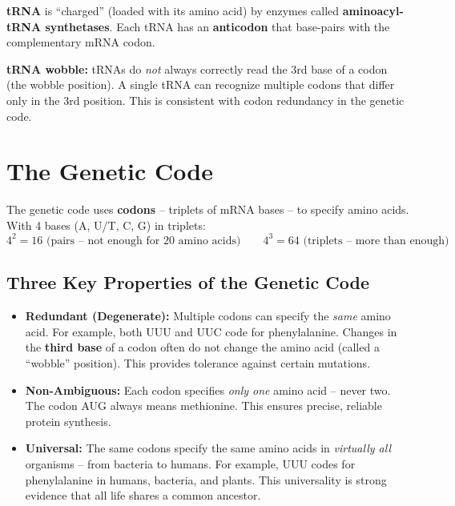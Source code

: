 \documentclass[11pt, letterpaper]{article}
\begin{document}
\textbf{tRNA} is ``charged'' (loaded with its amino acid) by enzymes called \textbf{aminoacyl-tRNA synthetases}. Each tRNA has an \textbf{anticodon} that base-pairs with the complementary mRNA codon.

\begin{tcolorbox}[colback=part4bg, colframe=sectionorange, arc=3pt, boxrule=1pt]
\textbf{tRNA wobble:} tRNAs do \emph{not} always correctly read the 3rd base of a codon (the wobble position). A single tRNA can recognize multiple codons that differ only in the 3rd position. This is consistent with codon redundancy in the genetic code.
\end{tcolorbox}

\section*{The Genetic Code}

The genetic code uses \textbf{codons} -- triplets of mRNA bases -- to specify amino acids. With 4 bases (A, U/T, C, G) in triplets:
\[
  4^2 = 16 \text{ (pairs -- not enough for 20 amino acids)} \qquad 4^3 = 64 \text{ (triplets -- more than enough)}
\]

\subsection*{Three Key Properties of the Genetic Code}

\begin{tcolorbox}[colback=part4bg, colframe=sectionorange, arc=3pt, boxrule=1pt]
\begin{itemize}[noitemsep, leftmargin=*]
  \item \textbf{Redundant (Degenerate):} Multiple codons can specify the \emph{same} amino acid. For example, both UUU and UUC code for phenylalanine. Changes in the \textbf{third base} of a codon often do not change the amino acid (called a ``wobble'' position). This provides tolerance against certain mutations.
  \item \textbf{Non-Ambiguous:} Each codon specifies \emph{only one} amino acid -- never two. The codon AUG always means methionine. This ensures precise, reliable protein synthesis.
  \item \textbf{Universal:} The same codons specify the same amino acids in \emph{virtually all} organisms -- from bacteria to humans. For example, UUU codes for phenylalanine in humans, bacteria, and plants. This universality is strong evidence that all life shares a common ancestor.
\end{itemize}
\end{tcolorbox}
\end{document}
